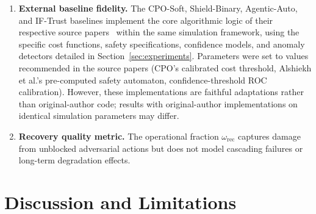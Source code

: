 \documentclass[10pt,journal,compsoc]{IEEEtran}
\begin{document}
\begin{enumerate}
    \item \textbf{External baseline fidelity.}  The CPO-Soft, Shield-Binary, Agentic-Auto, and IF-Trust baselines implement the core algorithmic logic of their respective source papers~\cite{achiam2017cpo,alshiekh2018shielding,toward_autonomous_oran_2026,zahoor2025ifocsvm} within the same simulation framework, using the specific cost functions, safety specifications, confidence models, and anomaly detectors detailed in Section~\ref{sec:experiments}.  Parameters were set to values recommended in the source papers (CPO's calibrated cost threshold, Alshiekh et al.'s pre-computed safety automaton, confidence-threshold ROC calibration).  However, these implementations are faithful adaptations rather than original-author code; results with original-author implementations on identical simulation parameters may differ.
    \item \textbf{Recovery quality metric.}  The operational fraction $\omega_{\mathrm{rec}}$ captures damage from unblocked adversarial actions but does not model cascading failures or long-term degradation effects.
\end{enumerate}


\section{Discussion and Limitations}
\end{document}
